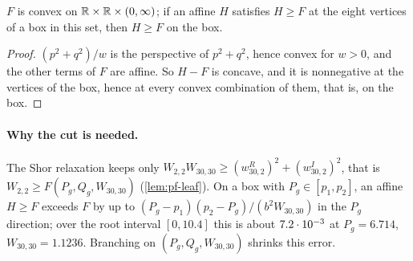 \begin{lemma}\label{lem:pf-planes}
$F$ is convex on $\mathbb{R}\times\mathbb{R}\times(0,\infty)$; if an affine $H$ satisfies $H\ge F$ at the eight vertices of a box in this set, then $H\ge F$ on the box.
\end{lemma}

\begin{proof}
$(p^2+q^2)/w$ is the perspective of $p^2+q^2$, hence convex for $w>0$, and the other terms of $F$ are affine.
So $H-F$ is concave, and it is nonnegative at the vertices of the box, hence at every convex combination of them, that is, on the box.
\end{proof}

\paragraph{Why the cut is needed.}
The Shor relaxation keeps only $W_{2,2}W_{30,30}\ge(w^R_{30,2})^2+(w^I_{30,2})^2$, that is $W_{2,2}\ge F(P_g,Q_g,W_{30,30})$ (\cref{lem:pf-leaf}).
On a box with $P_g\in[p_1,p_2]$, an affine $H\ge F$ exceeds $F$ by up to $(P_g-p_1)(p_2-P_g)/(b^2W_{30,30})$ in the $P_g$ direction;
over the root interval $[0,10.4]$ this is about $7.2\cdot 10^{-3}$ at $P_g=6.714$, $W_{30,30}=1.1236$.
Branching on $(P_g,Q_g,W_{30,30})$ shrinks this error.


